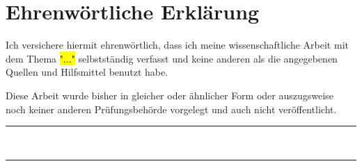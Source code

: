 \section*{Ehrenwörtliche Erklärung}

Ich versichere hiermit ehrenwörtlich, dass ich meine wissenschaftliche Arbeit mit dem Thema \hl{"..."} selbstständig verfasst und keine anderen als die angegebenen Quellen und Hilfsmittel benutzt habe. 

Diese Arbeit wurde bisher in gleicher oder ähnlicher Form oder auszugsweise noch
keiner anderen Prüfungsbehörde vorgelegt und auch nicht veröffentlicht.

\vspace{1cm}

\parbox{4cm}{%
    \rule{4cm}{1pt}\\
}\hfill
\parbox{5cm}{%
    \rule{5cm}{1pt}\\
}